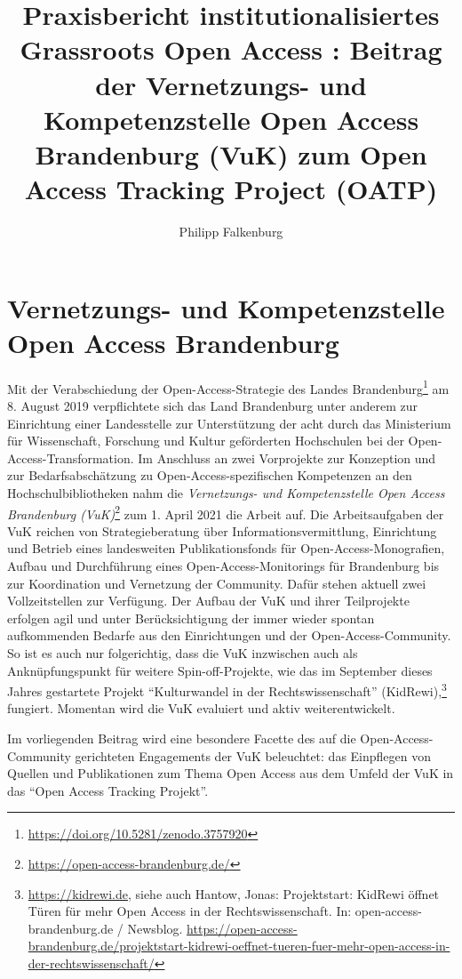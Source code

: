 \documentclass[a4paper,
fontsize=11pt,
oneside,
numbers=noperiodatend,
parskip=half-,
bibliography=totoc,
final
]{scrartcl}
\title{\LARGE{Praxisbericht institutionalisiertes Grassroots Open Access : Beitrag der Vernetzungs- und Kompetenzstelle Open Access Brandenburg (VuK) zum Open Access Tracking Project (OATP)}}%
\author{Philipp Falkenburg} %
\date{}
\begin{document}
\maketitle
\thispagestyle{fancyplain} 


\hypertarget{vernetzungs--und-kompetenzstelle-open-access-brandenburg}{%
\section{Vernetzungs- und Kompetenzstelle Open Access
Brandenburg}\label{vernetzungs--und-kompetenzstelle-open-access-brandenburg}}

Mit der Verabschiedung der Open-Access-Strategie des Landes
Brandenburg\footnote{\url{https://doi.org/10.5281/zenodo.3757920}} am 8.
August 2019 verpflichtete sich das Land Brandenburg unter anderem zur
Einrichtung einer Landesstelle zur Unterstützung der acht durch das
Ministerium für Wissenschaft, Forschung und Kultur geförderten
Hochschulen bei der Open-Access-Transformation. Im Anschluss an zwei
Vorprojekte zur Konzeption und zur Bedarfsabschätzung zu
Open-Access-spezifischen Kompetenzen an den Hochschulbibliotheken nahm
die \emph{Vernetzungs- und Kompetenzstelle Open Access Brandenburg
(VuK)}\footnote{\url{https://open-access-brandenburg.de/}} zum 1. April
2021 die Arbeit auf. Die Arbeitsaufgaben der VuK reichen von
Strategieberatung über Informationsvermittlung, Einrichtung und Betrieb
eines landesweiten Publikationsfonds für Open-Access-Monografien, Aufbau
und Durchführung eines Open-Access-Monitorings für Brandenburg bis zur
Koordination und Vernetzung der Community. Dafür stehen aktuell zwei
Vollzeitstellen zur Verfügung. Der Aufbau der VuK und ihrer Teilprojekte
erfolgen agil und unter Berücksichtigung der immer wieder spontan
aufkommenden Bedarfe aus den Einrichtungen und der
Open-Access-Community. So ist es auch nur folgerichtig, dass die VuK
inzwischen auch als Anknüpfungspunkt für weitere Spin-off-Projekte, wie
das im September dieses Jahres gestartete Projekt \enquote{Kulturwandel
in der Rechtswissenschaft} (KidRewi),\footnote{\url{https://kidrewi.de},
  siehe auch Hantow, Jonas: Projektstart: KidRewi öffnet Türen für mehr
  Open Access in der Rechtswissenschaft. In: open-access-brandenburg.de
  / Newsblog.
  \url{https://open-access-brandenburg.de/projektstart-kidrewi-oeffnet-tueren-fuer-mehr-open-access-in-der-rechtswissenschaft/}}
fungiert. Momentan wird die VuK evaluiert und aktiv weiterentwickelt.

Im vorliegenden Beitrag wird eine besondere Facette des auf die
Open-Access-Community gerichteten Engagements der VuK beleuchtet: das
Einpflegen von Quellen und Publikationen zum Thema Open Access aus dem
Umfeld der VuK in das \enquote{Open Access Tracking Projekt}.
\end{document}
